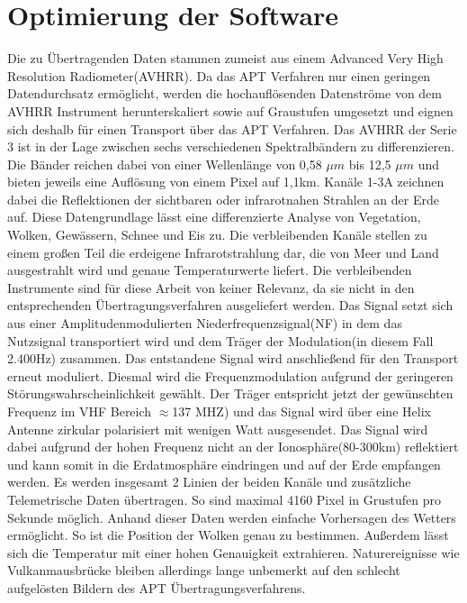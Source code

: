 \section[]{Optimierung der Software}
\begin{multicols*}{2}
    Die zu Übertragenden Daten stammen zumeist aus einem \glqq Advanced Very High Resolution Radiometer\grqq (AVHRR). Da das APT Verfahren nur einen geringen Datendurchsatz ermöglicht, werden die hochauflösenden Datenströme von dem AVHRR Instrument herunterskaliert sowie auf Graustufen umgesetzt und eignen sich deshalb für einen Transport über das APT Verfahren. Das AVHRR der Serie 3 ist in der Lage zwischen sechs verschiedenen Spektralbändern zu differenzieren. Die Bänder reichen dabei von einer Wellenlänge von 0,58 \( \mu m\) bis 12,5 \( \mu m\) und bieten jeweils eine Auflösung von einem Pixel auf 1,1km. Kanäle 1-3A zeichnen dabei die Reflektionen der sichtbaren oder infrarotnahen Strahlen an der Erde auf. 
    Diese Datengrundlage lässt eine differenzierte Analyse von Vegetation, Wolken, Gewässern, Schnee und Eis zu. Die verbleibenden Kanäle stellen zu einem großen Teil die erdeigene Infrarotstrahlung dar, die von Meer und Land ausgestrahlt wird und genaue Temperaturwerte liefert. 
    Die verbleibenden Instrumente sind für diese Arbeit von keiner Relevanz, da sie nicht in den entsprechenden Übertragungsverfahren ausgeliefert werden. 
    \cite{Apt-System} 
    Das Signal setzt sich aus einer Amplitudenmodulierten Niederfrequenzsignal(NF) in dem das Nutzsignal transportiert wird und dem Träger der Modulation(in diesem Fall 2.400Hz) zusammen. Das entstandene Signal wird anschließend für den Transport erneut moduliert. Diesmal wird die Frequenzmodulation aufgrund der geringeren Störungswahrscheinlichkeit gewählt. Der Träger entspricht jetzt der gewünschten Frequenz im VHF Bereich \( \approx  \)137 MHZ) und das Signal wird über eine Helix Antenne zirkular polarisiert mit wenigen Watt ausgesendet. Das Signal wird dabei aufgrund der hohen Frequenz nicht an der Ionosphäre(80-300km) reflektiert und kann somit in die Erdatmosphäre eindringen und auf der Erde empfangen werden. Es werden insgesamt 2 Linien der beiden Kanäle und zusätzliche Telemetrische Daten übertragen. So sind maximal 4160 Pixel in Grustufen pro Sekunde möglich. Anhand dieser Daten werden einfache Vorhersagen des Wetters ermöglicht. So ist die Position der Wolken genau zu bestimmen. Außerdem lässt sich die Temperatur mit einer hohen Genauigkeit extrahieren. Naturereignisse wie Vulkanmausbrücke bleiben allerdings lange unbemerkt auf den schlecht aufgelösten Bildern des APT Übertragungsverfahrens. 

\end{multicols*}
